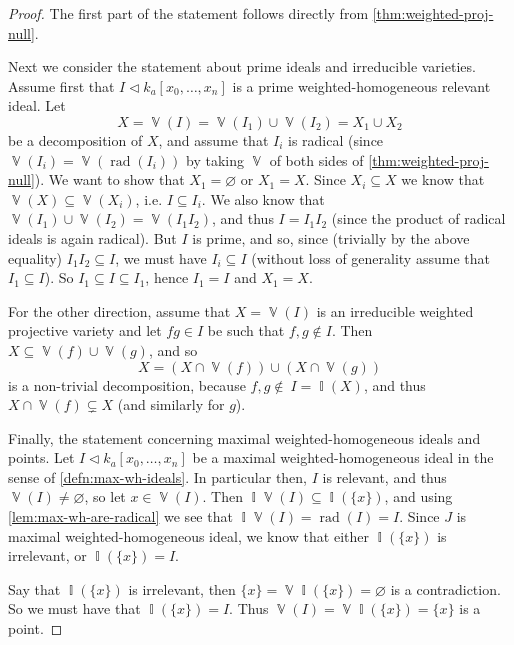 \documentclass[10pt,notitlepage]{article}
\numberwithin{equation}{subsection}
\DeclareMathOperator{\van}{\mathbb{V}}
\DeclareMathOperator{\ide}{\mathbb{I}}
\DeclareMathOperator{\rad}{rad}
\newcommand{\kazn}{k_a[x_0,\ldots,x_n]}
\begin{document}
    \begin{proof}
        The first part of the statement follows directly from \cref{thm:weighted-proj-null}.
        
        \bigskip
        
        Next we consider the statement about prime ideals and irreducible varieties.
        Assume first that $I\triangleleft\kazn$ is a prime weighted-homogeneous relevant ideal.
        Let
        \[
            X=\van(I)=\van(I_1)\cup\van(I_2)=X_1\cup X_2
        \]
        be a decomposition of $X$, and assume that $I_i$ is radical (since $\van(I_i)=\van(\rad(I_i))$ by taking $\van$ of both sides of \cref{thm:weighted-proj-null}).
        We want to show that $X_1=\varnothing$ or $X_1=X$.
        Since $X_i\subseteq X$ we know that $\van(X)\subseteq\van(X_i)$, i.e. $I\subseteq I_i$.
        We also know that $\van(I_1)\cup\van(I_2)=\van(I_1 I_2)$, and thus $I=I_1 I_2$ (since the product of radical ideals is again radical).
        But $I$ is prime, and so, since (trivially by the above equality) $I_1 I_2\subseteq I$, we must have $I_i\subseteq I$ (without loss of generality assume that $I_1\subseteq I$).
        So $I_1\subseteq I\subseteq I_1$, hence $I_1=I$ and $X_1=X$.

        For the other direction, assume that $X=\van(I)$ is an irreducible weighted projective variety and let $fg\in I$ be such that $f,g\not\in I$.
        Then $X\subseteq\van(f)\cup\van(g)$, and so
        \[
            X = (X\cap\van(f)) \cup (X\cap\van(g))
        \]
        is a non-trivial decomposition, because $f,g\not\in\ I=\ide(X)$, and thus $X\cap\van(f)\subsetneq X$ (and similarly for $g$).

        \bigskip

        Finally, the statement concerning maximal weighted-homogeneous ideals and points.
        Let $I\triangleleft\kazn$ be a maximal weighted-homogeneous ideal in the sense of \cref{defn:max-wh-ideals}.
        In particular then, $I$ is relevant, and thus $\van(I)\neq\varnothing$, so let $x\in\van(I)$.
        Then $\ide\van(I)\subseteq\ide(\{x\})$, and using \cref{lem:max-wh-are-radical} we see that $\ide\van(I)=\rad(I)=I$.
        Since $J$ is maximal weighted-homogeneous ideal, we know that either $\ide(\{x\})$ is irrelevant, or $\ide(\{x\})=I$.

        Say that $\ide(\{x\})$ is irrelevant, then $\{x\}=\van\ide(\{x\})=\varnothing$ is a contradiction.
        So we must have that $\ide(\{x\})=I$.
        Thus $\van(I)=\van\ide(\{x\})=\{x\}$ is a point.


\end{proof}
\end{document}
